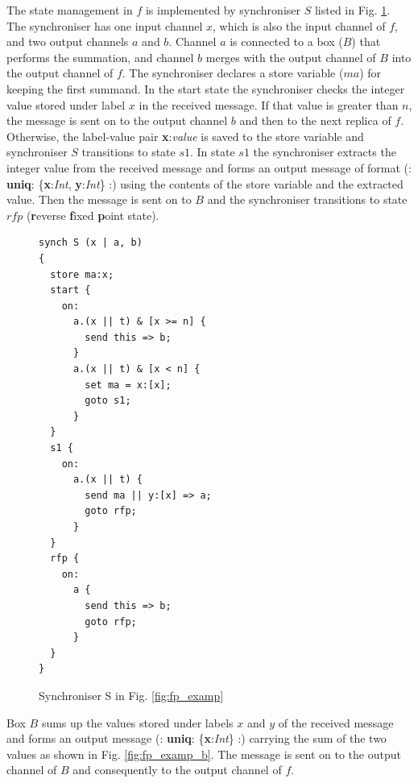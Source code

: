 The state management in $f$ is implemented by synchroniser $S$ listed in Fig. \ref{ffp:synch_s}. The synchroniser has one input channel $x$, which is also the input channel of $f$, and two output channels $a$ and $b$. Channel $a$ is connected to a box ($B$) that performs the summation, and channel $b$ merges with the output channel of $B$ into the output channel of $f$. The synchroniser declares a store variable ($ma$) for keeping the first summand. In the start state the synchroniser checks the integer value stored under label $x$ in the received message. If that value is greater than $n$, the message is sent on to the output channel $b$ and then to the next replica of $f$. Otherwise, the label-value pair \textbf{x}:\emph{value} is saved to the store variable and synchroniser $S$ transitions to state $s1$. In state $s1$ the synchroniser extracts the integer value from the received message and forms an output message of format (: \textbf{uniq}: \{\textbf{x}:\emph{Int}, \textbf{y}:\emph{Int}\} :) using the contents of the store variable and the extracted value. Then the message is sent on to $B$ and the synchroniser transitions to state $rfp$ (\textbf{r}everse \textbf{f}ixed \textbf{p}oint state).

\begin{figure}[h!]
\lstset{numbers=left, numberstyle=\small, stepnumber=1, numbersep=8pt}
\begin{lstlisting}[frame=single]
synch S (x | a, b)
{
  store ma:x;
  start {
    on:
      a.(x || t) & [x >= n] {
        send this => b;
      }
      a.(x || t) & [x < n] {
        set ma = x:[x];
        goto s1;
      }
  }
  s1 {
    on:
      a.(x || t) {
        send ma || y:[x] => a;
        goto rfp;
      }
  }
  rfp {
    on:
      a {
        send this => b;
        goto rfp;
      }
  }
}
\end{lstlisting}
\caption{Synchroniser S in Fig. \ref{fig:fp_examp}}
\label{ffp:synch_s}
\end{figure}

Box $B$ sums up the values stored under labels $x$ and $y$ of the received message and forms an output message (: \textbf{uniq}: \{\textbf{x}:\emph{Int}\} :) carrying the sum of the two values as shown in Fig. \ref{fig:fp_examp_b}. The message is sent on to the output channel of $B$ and consequently to the output channel of $f$.

